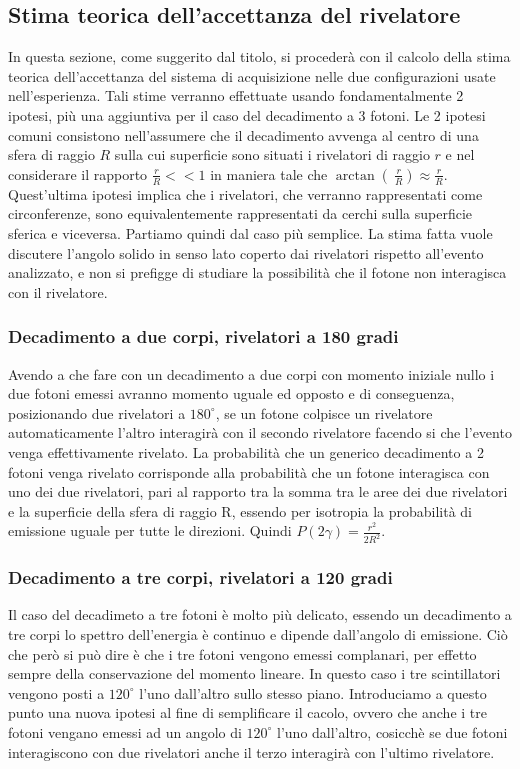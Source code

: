 \subsection{Stima teorica dell'accettanza del rivelatore}
  In questa sezione, come suggerito dal titolo, si procederà con il calcolo della stima teorica dell'accettanza del sistema di acquisizione nelle due configurazioni usate 
  nell'esperienza. Tali stime verranno effettuate usando fondamentalmente 2 ipotesi, più una aggiuntiva per il caso del decadimento a 3 fotoni. Le 2 ipotesi comuni consistono 
  nell'assumere che il decadimento avvenga al centro di una sfera di raggio \(R\) sulla cui superficie sono situati i rivelatori di raggio \(r\) e nel considerare il rapporto 
  \( \frac{r}{R} << 1 \) in maniera tale che \(\arctan\left(\ \frac{r}{R} \right) \approx \frac{r}{R} \). Quest'ultima ipotesi implica che i rivelatori, che verranno rappresentati come
  circonferenze, sono equivalentemente rappresentati da cerchi sulla superficie sferica e viceversa. Partiamo quindi dal caso più semplice. La stima fatta vuole
discutere l'angolo solido in senso lato coperto dai rivelatori rispetto all'evento analizzato, e non si prefigge di studiare la possibilità che il fotone non
interagisca con il rivelatore.
  \subsubsection{Decadimento a due corpi, rivelatori a 180 gradi}
  Avendo a che fare con un decadimento a due corpi con momento iniziale nullo i due fotoni emessi avranno momento uguale ed opposto e di conseguenza, posizionando due rivelatori
  a \(180^\circ\), se un fotone colpisce un rivelatore automaticamente l'altro interagirà con il secondo rivelatore facendo si che l'evento venga effettivamente rivelato. La
  probabilità che un generico decadimento a 2 fotoni venga rivelato corrisponde alla probabilità che un fotone interagisca con  uno dei due rivelatori, pari al rapporto tra la 
  somma tra le aree dei due rivelatori e la superficie della sfera di raggio R, essendo per isotropia la probabilità di emissione uguale per tutte le direzioni. Quindi
  \(P\left(2\gamma\right) = \frac{r^2}{2R^2}\).
  \subsubsection{Decadimento a tre corpi, rivelatori a 120 gradi}
  Il caso del decadimeto a tre fotoni è molto più delicato, essendo un decadimento a tre corpi lo spettro dell'energia è continuo e dipende dall'angolo di emissione. Ciò che però
  si può dire è che i tre fotoni vengono emessi complanari, per effetto sempre della conservazione del momento lineare. In questo caso i tre scintillatori vengono posti a \(120^\circ\)
  l'uno dall'altro sullo stesso piano. Introduciamo a questo punto una nuova ipotesi al fine di semplificare il cacolo, ovvero che anche i tre fotoni vengano emessi ad un angolo di
  \(120^\circ\) l'uno dall'altro, cosicchè se due fotoni interagiscono con due rivelatori anche il terzo interagirà con l'ultimo rivelatore. 
  
